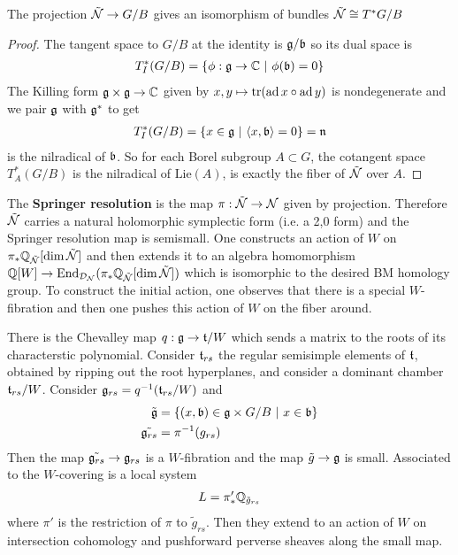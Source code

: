 \documentclass[12pt]{article}
\begin{document}
\begin{lemma}
    The projection $\tilde {{\mathcal{N}}} \to G/B$ gives an isomorphism of bundles $\tilde {{\mathcal{N}}} \cong T^*G/B$
\end{lemma}

\begin{proof}
    The tangent space to $G/B$ at the identity is $\mathfrak{g}/\mathfrak{b}$ so its dual space is \begin{align*}
        T^*_I(G/B) = \{\phi:\mathfrak{g} \to \mathbb{C} \ \vert \  \phi(\mathfrak{b}) = 0\}
    \end{align*} The Killing form $\mathfrak{g} \times \mathfrak{g} \to \mathbb{C}$ given by
    $x,y\mapsto \operatorname{tr}(\operatorname{ad} x \circ \operatorname{ad} y)$ is nondegenerate and we pair $\mathfrak{g}$ with $\mathfrak{g}^*$
    to get \begin{align*}
        T^*_I(G/B) = \{x\in \mathfrak{g} \ \vert \  \langle x,\mathfrak{b}\rangle = 0\} = \mathfrak{n}
    \end{align*} is the nilradical of $\mathfrak{b}$. So for each Borel subgroup $A\subset G$,
    the cotangent space $T^*_{A}(G/B)$ is the nilradical of $\text{Lie}(A)$, is exactly
    the fiber of $\tilde {{\mathcal{N}}}$ over $A$.
\end{proof}

The \textbf{Springer resolution} is the map $\pi:\tilde {{\mathcal{N}}} \to {\mathcal{N}}$
given by projection.
Therefore $\tilde {{\mathcal{N}}}$ carries a natural holomorphic symplectic form (i.e. a 2,0 form)
and the Springer resolution map is semismall. One constructs an action of $W$ on
$\pi_*\mathbb{Q}_{\tilde {{\mathcal{N}}}}[\dim \tilde {{\mathcal{N}}}]$ and then extends it to an algebra homomorphism
$\mathbb{Q}[W] \to \operatorname{End}_{{\mathcal{D}}_{{\mathcal{N}}}}(\pi_*\mathbb{Q}_{\tilde {{\mathcal{N}}}}[\dim \tilde {{\mathcal{N}}}])$
which is isomorphic to the desired BM homology group. To construct the initial action,
one observes that there is a special $W$-fibration and then one pushes this action
of $W$ on the fiber around.



There is the Chevalley map $q:\mathfrak{g}\to \mathfrak{t}/W$ which sends a
matrix to the roots of its characterstic polynomial. Consider $\mathfrak{t}_{rs}$
the regular semisimple elements of $\mathfrak{t}$, obtained by ripping out the
root hyperplanes, and consider a dominant chamber $\mathfrak{t}_{rs}/W$.
Consider $\mathfrak{g}_{rs} = q^{-1}(\mathfrak{t}_{rs}/W)$ and
\begin{align*}
    \tilde{\mathfrak{g}}      & = \{(x,\mathfrak{b})\in \mathfrak{g}\times G/B \ \vert \  x\in \mathfrak{b}\} \\
    \tilde{\mathfrak{g}_{rs}} & = \pi^{-1}(g_{rs})
\end{align*}
Then the map $\tilde{\mathfrak{g}_{rs}} \to \mathfrak{g}_{rs}$ is a $W$-fibration and
the map $\tilde g \to \mathfrak{g}$ is small. Associated to the $W$-covering is
a local system \begin{align*}
    L = \pi'_*\mathbb{Q}_{\tilde g_{rs}}
\end{align*} where $\pi'$ is the restriction of $\pi$ to $\tilde g_{rs}$.
Then they extend to an action of $W$ on intersection cohomology and pushforward perverse
sheaves along the small map.
\end{document}
